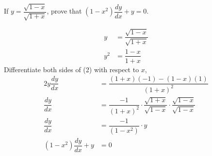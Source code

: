 

\question If $y=\dfrac{\sqrt{1-x}}{\sqrt{1+x}}$, prove that
$(1-x^2)\dfrac{dy}{dx}+y=0$.

\insertQR{}

\begin{solution}
  \begin{align}
    y  &=\dfrac{\sqrt{1-x}}{\sqrt{1+x}} \\
    y^2&=\dfrac{1-x}{1+x}
  \end{align}
  Differentiate both sides of (2) with respect to $x$,
  \begin{align}
    2y\dfrac{dy}{dx}&=\dfrac{(1+x)(-1)-(1-x)(1)}{(1+x)^2} \\
    \dfrac{dy}{dx}  &=\dfrac{-1}{(1+x)^2}
                      \cdot\dfrac{\sqrt{1+x}}{\sqrt{1-x}}
                      \cdot\dfrac{\sqrt{1-x}}{\sqrt{1-x}} \\
    \dfrac{dy}{dx}  &=\dfrac{-1}{(1-x^2)}\cdot y \\
    (1-x^2)\dfrac{dy}{dx}+y&=0
  \end{align}

\end{solution}

